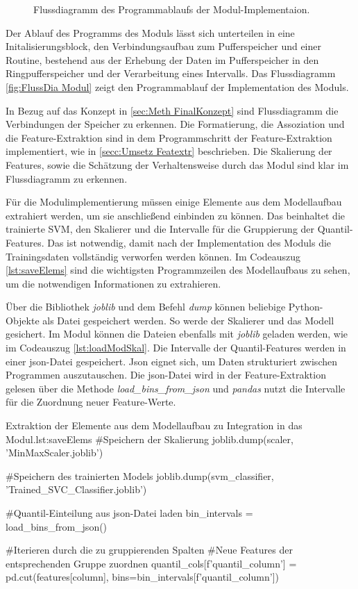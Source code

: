 \begin{figure}[p]
    \caption{Flussdiagramm des Programmablaufs der Modul-Implementaion.}
    \label{fig:FlussDia Modul}
\end{figure}

Der Ablauf des Programms des Moduls lässt sich unterteilen in eine Initalisierungsblock, den Verbindungsaufbau zum Pufferspeicher und einer Routine, bestehend aus der Erhebung der Daten im Pufferspeicher in den Ringpufferspeicher und der Verarbeitung eines Intervalls. Das Flussdiagramm \autoref{fig:FlussDia Modul} zeigt den Programmablauf der Implementation des Moduls. \par

In Bezug auf das Konzept in \autoref{sec:Meth FinalKonzept} sind Flussdiagramm die Verbindungen der Speicher zu erkennen. Die Formatierung, die Assoziation und die Feature-Extraktion sind in dem Programmschritt der Feature-Extraktion implementiert, wie in \autoref{secc:Umsetz Featextr} beschrieben. Die Skalierung der Features, sowie die Schätzung der Verhaltensweise durch das Modul sind klar im Flussdiagramm zu erkennen. \par

Für die Modulimplementierung müssen einige Elemente aus dem Modellaufbau extrahiert werden, um sie anschließend einbinden zu können. Das beinhaltet die trainierte SVM, den Skalierer und die Intervalle für die Gruppierung der Quantil-Features. Das ist notwendig, damit nach der Implementation des Moduls die Trainingsdaten vollständig verworfen werden können. Im Codeauszug \ref{lst:saveElems} sind die wichtigsten Programmzeilen des Modellaufbaus zu sehen, um die notwendigen Informationen zu extrahieren.\par

Über die Bibliothek \textit{joblib} und dem Befehl \textit{dump} können beliebige Python-Objekte als Datei gespeichert werden. So werde der Skalierer und das Modell gesichert. Im Modul können die Dateien ebenfalls mit \textit{joblib} geladen werden, wie im Codeauszug \ref{lst:loadModSkal}. Die Intervalle der Quantil-Features werden in einer json-Datei gespeichert. Json eignet sich, um Daten strukturiert zwischen Programmen auszutauschen. Die json-Datei wird in der Feature-Extraktion gelesen über die Methode \textit{load\_bins\_from\_json} und \textit{pandas} nutzt die Intervalle für die Zuordnung neuer Feature-Werte.

\begin{pythoncode}{Extraktion der Elemente aus dem Modellaufbau zu Integration in das Modul.}{lst:saveElems}
#Speichern der Skalierung 
joblib.dump(scaler, 'MinMaxScaler.joblib')

#Speichern des trainierten Models
joblib.dump(svm_classifier, 'Trained_SVC_Classifier.joblib')


#Quantil-Einteilung aus json-Datei laden
bin_intervals = load_bins_from_json()

#Iterieren durch die zu gruppierenden Spalten
#Neue Features der entsprechenden Gruppe zuordnen 
quantil_cols[f'quantil_{column}'] = pd.cut(features[column], 
                                       bins=bin_intervals[f'quantil_{column}'])
\end{pythoncode}                                       

